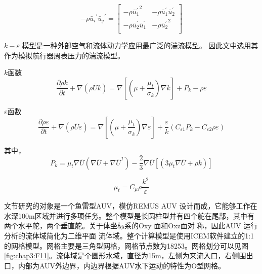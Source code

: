 \begin{equation}
\label{eq:chap3:16}
 - \rho {{\bar u_i}^{'}}{{\bar u_j}^{'}} = \left[ {\begin{array}{*{20}{c}}
   { - \rho \bar u{{_1^{'}}^2}} & { - \rho {\bar u_1^{'}}{\bar u_2^{'}}}  \\
   { - \rho {\bar u_2^{'}}{\bar u_1^{'}}} & { - \rho \bar u{{_2^{'}}^2}}  \\
\end{array}} \right]
\end{equation}

$k-\varepsilon$ 模型是一种外部空气和流体动力学应用最广泛的湍流模型\cite{lamb1932hydrodynamics}。 因此文中选用其作为模拟航行器周表压力的湍流模型。

$k$函数\\

\begin{equation}
\label{eq:chap3:17}
\frac{{\partial \rho k}}{{\partial t}} + \nabla \left( {\rho \bar Uk} \right) = \nabla \left[ {\left( {\mu  + \frac{{{\mu _t}}}{{{\sigma _k}}}} \right)\nabla k} \right] + {P_k} - \rho \varepsilon
\end{equation}

$\varepsilon$函数\\

\begin{equation}
\label{eq:chap3:18}
\frac{{\partial \rho \varepsilon }}{{\partial t}} + \nabla \left( {\rho \bar U\varepsilon } \right) = \nabla \left[ {\left( {\mu  + \frac{{{\mu _t}}}{{{\sigma _k}}}} \right)\nabla \varepsilon } \right] + \frac{\varepsilon }{k}\left( {{C_{\varepsilon 1}}{P_k} - {C_{\varepsilon 2}}\rho \varepsilon } \right)\end{equation}

其中，\[{P_k} = {\mu _t}\nabla \bar U \left( {\nabla \bar U + \nabla {{\bar U}^T}} \right) - \frac{2}{3}\nabla {\bar U} \left[ \left( {3{\mu _t}\nabla } \bar U   + \rho k   \right)\right] \]

\[{\mu _t} = {C_\mu }\rho \frac{{{k^2}}}{\varepsilon }\]

文节研究的对象是一个鱼雷型AUV，模仿REMUS AUV 设计而成，它能够工作在水深100m区域并进行多项任务。整个模型是长圆柱型并有四个舵在尾部，其中有两个水平舵，两个垂直舵。关于体坐标系的Oxy 面和Oxz面对
称，因此AUV 运行分析的流体域简化为二维平面
流体域。整个计算模型是使用ICEM软件建立的1:1的网格模型。网格主要是三角型网格，网格节点数为18253。网格划分可以见图\ref{fig:chap3:F11}。流体域是个圆形水域，直径为15m，左侧为来流入口，右侧围出口，内部为AUV外边界，内边界根据AUV水下运动的特性为O型网格。

